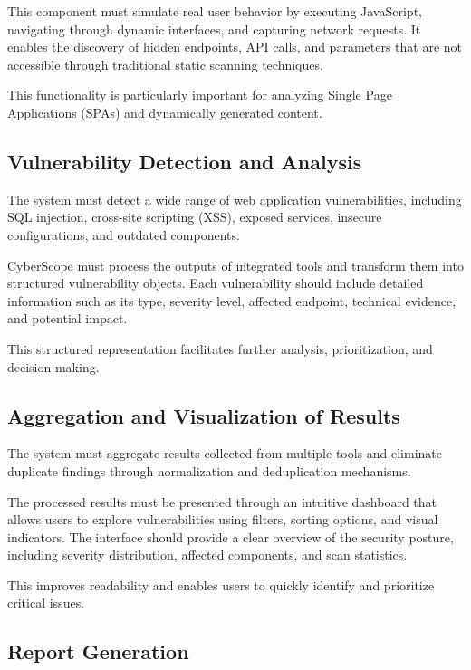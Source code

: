 \indent This component must simulate real user behavior by executing JavaScript, navigating through dynamic interfaces, and capturing network requests. It enables the discovery of hidden endpoints, API calls, and parameters that are not accessible through traditional static scanning techniques.

\indent This functionality is particularly important for analyzing Single Page Applications (SPAs) and dynamically generated content.

\subsection{Vulnerability Detection and Analysis}

\indent The system must detect a wide range of web application vulnerabilities, including SQL injection, cross-site scripting (XSS), exposed services, insecure configurations, and outdated components.

\indent CyberScope must process the outputs of integrated tools and transform them into structured vulnerability objects. Each vulnerability should include detailed information such as its type, severity level, affected endpoint, technical evidence, and potential impact.

\indent This structured representation facilitates further analysis, prioritization, and decision-making.

\subsection{Aggregation and Visualization of Results}

\indent The system must aggregate results collected from multiple tools and eliminate duplicate findings through normalization and deduplication mechanisms.

\indent The processed results must be presented through an intuitive dashboard that allows users to explore vulnerabilities using filters, sorting options, and visual indicators. The interface should provide a clear overview of the security posture, including severity distribution, affected components, and scan statistics.

\indent This improves readability and enables users to quickly identify and prioritize critical issues.

\subsection{Report Generation}

